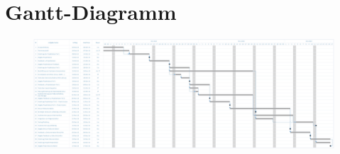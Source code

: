 \newpage

\section{Gantt-Diagramm}

\begin{figure}[ht]
    \centering
    \includegraphics[angle=90,scale=0.3]{images/gantt}
    \label{fig:gantt}
\end{figure}

\newpage